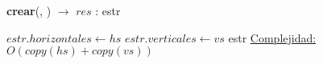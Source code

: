 \begin{Algoritmos}

    \begin{algorithm}[H]{\textbf{crear}(, ) $\to$ $res$ : estr}
    \begin{algorithmic}[1]
        \State $estr.horizontales \gets hs$
        \State $estr.verticales \gets vs$
        \Return estr
        \medskip
        \Statex \underline{Complejidad:} $O(copy(hs) + copy(vs))$
    \end{algorithmic}
    \end{algorithm}
    
    \completar
      
\end{Algoritmos}
    